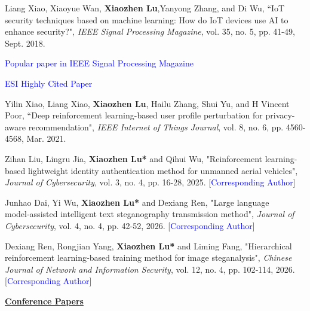 \documentclass{article}
\newcommand{\pubheading}[1]{\par\bigskip\underline{\textbf{#1}}\par}
\begin{document}
\begin{justifying}
\begin{myreferences}
 \item Liang Xiao, Xiaoyue Wan, \textbf{Xiaozhen Lu},Yanyong Zhang, and Di Wu, ``IoT security techniques based on machine learning: How do IoT devices use AI to enhance security?", \emph{IEEE Signal Processing Magazine}, vol. 35, no. 5, pp. 41-49, Sept. 2018.
 \begin{subitems}
 	\item \textcolor{blue}{Popular paper in IEEE Signal Processing Magazine}
 	\item \textcolor{blue}{ESI Highly Cited Paper}
 \end{subitems}
 \item Yilin Xiao, Liang Xiao, \textbf{Xiaozhen Lu}, Hailu Zhang, Shui Yu, and H Vincent Poor, ``Deep reinforcement learning-based user profile perturbation for privacy-aware recommendation", \emph{IEEE Internet of Things Journal}, vol. 8, no. 6, pp. 4560-4568, Mar. 2021.
 \item Zihan Liu, Lingru Jia, \textbf{Xiaozhen Lu*} and Qihui Wu, "Reinforcement learning-based lightweight identity authentication method for unmanned aerial vehicles", \emph{Journal of Cybersecurity}, vol. 3, no. 4, pp. 16-28, 2025. [\textcolor{blue}{Corresponding Author}]
 \item Junhao Dai, Yi Wu, \textbf{Xiaozhen Lu*} and Dexiang Ren, "Large language model‑assisted intelligent text steganography transmission method", \emph{Journal of Cybersecurity}, vol. 4, no. 4, pp. 42‑52, 2026. [\textcolor{blue}{Corresponding Author}]
 \item Dexiang Ren, Rongjian Yang, \textbf{Xiaozhen Lu*} and Liming Fang, "Hierarchical reinforcement learning‑based training method for image steganalysis", \emph{Chinese Journal of Network and Information Security}, vol. 12, no. 4, pp. 102‑114, 2026. [\textcolor{blue}{Corresponding Author}]
		
    
    
\end{myreferences}
\end{justifying}
\pubheading{Conference Papers}
\end{document}
